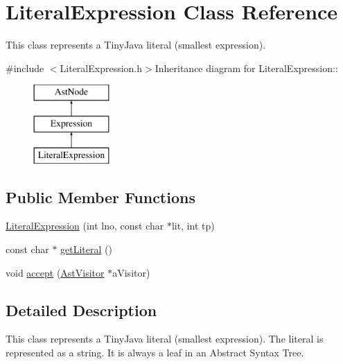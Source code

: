 \hypertarget{classLiteralExpression}{
\section{LiteralExpression Class Reference}
\label{classLiteralExpression}
}


This class represents a TinyJava literal (smallest expression).  


{\ttfamily \#include $<$LiteralExpression.h$>$}Inheritance diagram for LiteralExpression::\begin{figure}[H]
\begin{center}
\leavevmode
\includegraphics[height=3cm]{classLiteralExpression}
\end{center}
\end{figure}
\subsection*{Public Member Functions}
\begin{DoxyCompactItemize}
\item 
\hyperlink{classLiteralExpression_a4401fd6efc3f6808d28d64a734070df6}{LiteralExpression} (int lno, const char $\ast$lit, int tp)
\item 
const char $\ast$ \hyperlink{classLiteralExpression_a6e8ba5b0d9da137dfe00750cbfe125b3}{getLiteral} ()
\item 
void \hyperlink{classLiteralExpression_a02054e805df96a9d75ea64acc35d15a7}{accept} (\hyperlink{classAstVisitor}{AstVisitor} $\ast$aVisitor)
\end{DoxyCompactItemize}


\subsection{Detailed Description}
This class represents a TinyJava literal (smallest expression). The literal is represented as a string. It is always a leaf in an Abstract Syntax Tree. 

